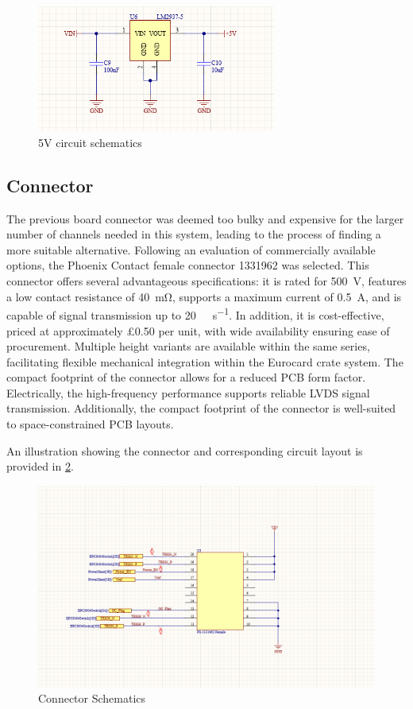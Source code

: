 \documentclass[a4paper,11pt]{article}
\begin{document}
\begin{figure}[htbp]
\centering
\includegraphics[width=0.7\textwidth]{5VCircuit.png}
\caption{5V circuit schematics\label{fig:5VCircuit}}
\end{figure}

\subsection{Connector}

The previous board connector was deemed too bulky and expensive for the larger number of channels needed in this system, leading to the process of finding a more suitable alternative. Following an evaluation of commercially available options, the Phoenix Contact female connector 1331962 \cite{1331962} was selected. This connector offers several advantageous specifications: it is rated for \SI{500}{\volt}, features a low contact resistance of \SI{40}{\milli\ohm}, supports a maximum current of \SI{0.5}{\ampere}, and is capable of signal transmission up to \SI{20}{\giga\bit\per\second}. In addition, it is cost-effective, priced at approximately \pounds 0.50 per unit, with wide availability ensuring ease of procurement. Multiple height variants are available within the same series, facilitating flexible mechanical integration within the Eurocard crate system. The compact footprint of the connector allows for a reduced PCB form factor. Electrically, the high-frequency performance supports reliable LVDS signal transmission. Additionally, the compact footprint of the connector is well-suited to space-constrained PCB layouts.

An illustration showing the connector and corresponding circuit layout is provided in \cref{fig:Connector}.

\begin{figure}[htbp]
\centering
\includegraphics[scale=0.5]{Connector.png}
\caption{Connector Schematics\label{fig:Connector}}
\end{figure}
\end{document}
